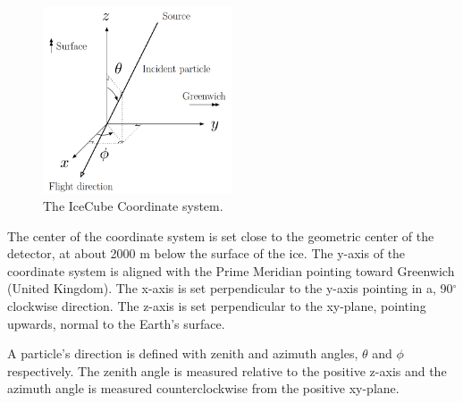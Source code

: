 \begin{figure}[t]
\centering
\includegraphics[width=0.5\textwidth]{chapter7/img/CoordinateSystem.png}
\caption{The IceCube Coordinate system.}
\label{fig:coordinates}
\end{figure}

\noindent The center of the coordinate system is set close to the geometric center of the detector, at about 2000 m below the surface of the ice. The y-axis of the coordinate system is aligned with the Prime Meridian pointing toward Greenwich (United Kingdom). The x-axis is set perpendicular to the y-axis pointing in a, 90$^\circ$ clockwise direction. The z-axis is set perpendicular to the xy-plane, pointing upwards, normal to the Earth's surface.

A particle's direction is defined with zenith and azimuth angles, $\theta$ and $\phi$ respectively. The zenith angle is measured relative to the positive z-axis and the azimuth angle is measured counterclockwise from the positive xy-plane.